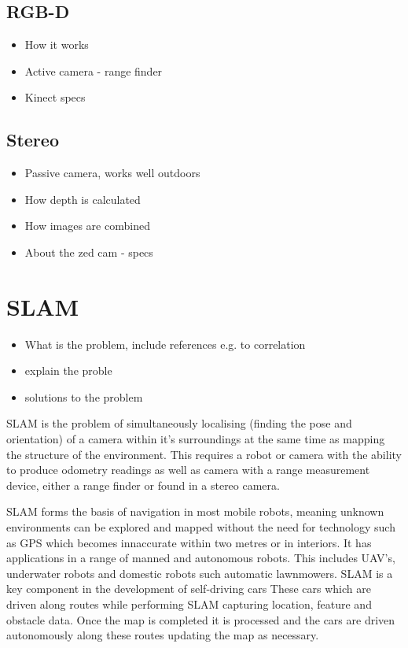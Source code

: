 \documentclass{mproj}
\begin{document}
\subsection{RGB-D}
\begin{itemize}
  \item How it works
  \item Active camera - range finder
  \item Kinect specs
\end{itemize}
\subsection{Stereo}

\begin{itemize}
  \item Passive camera, works well outdoors
  \item How depth is calculated
  \item How images are combined 
  \item About the zed cam - specs
\end{itemize}

\section{SLAM}
\begin{itemize}

  \item What is the problem, include references e.g. to correlation
  \item explain the proble
  \item solutions to the problem

 
\end{itemize}


SLAM is the problem of simultaneously localising (finding the pose and orientation) of a camera within it's surroundings at the same time as mapping the structure of the environment. This requires a robot or camera with the ability to produce odometry readings as well as camera with a range measurement device, either a range finder or found in a stereo camera. 

SLAM forms the basis of navigation in most mobile robots, meaning unknown environments can be explored and mapped without the need for technology such as GPS which becomes innaccurate within two metres or in interiors. It has applications in a range of manned and autonomous robots. This includes UAV's, underwater robots and domestic robots such automatic lawnmowers. SLAM is a key component in the development of self-driving cars These cars which are driven along routes while performing SLAM capturing location, feature and obstacle data. Once the map is completed it is processed and the cars are driven autonomously along these routes updating the map as necessary.
\end{document}
